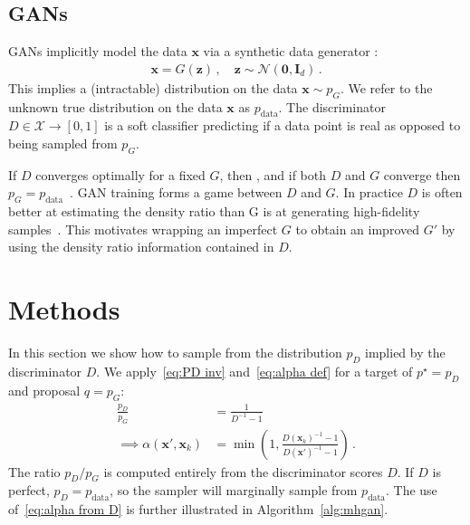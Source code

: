 \documentclass{article}
\renewcommand{\vec}[1]{{\boldsymbol{\mathbf{#1}}}} %
\newcommand{\R}{\mathbb{R}}
\newcommand{\set}[1]{\mathcal{#1}}
\newcommand{\sample}{\sim}
\newcommand{\norm}{\mathcal{N}}
\newcommand{\target}{{p^\star}}
\newcommand{\prop}{q}
\newcommand{\PG}{{p_G}}
\newcommand{\PD}{{p_D}}
\newcommand{\PR}{{p_{\textrm{data}}}}
\newcommand{\accept}{\alpha}
\newcommand{\setx}{\set{X}}
\begin{document}

\subsection{GANs}
\label{sec:GANs}

GANs implicitly model the data $\vec x$ via a synthetic data generator \smash{$G \in \R^{d} \rightarrow \setx$}:
\begin{align}
  \vec x = G(\vec z)\,, \quad \vec z \sample \norm(\vec 0, \vec I_{d})\,.
\end{align}
This implies a (intractable) distribution on the data $\vec x \sample \PG$.
We refer to the unknown true distribution on the data $\vec x$ as $\PR$.
The discriminator $D \in \setx \rightarrow [0,1]$ is a soft classifier predicting if a data point is real as opposed to being sampled from $\PG$\@.

If $D$ converges optimally for a fixed $G$, then \smash{$D = \PR/(\PR + \PG)$}, and if both $D$ and $G$ converge then $\PG = \PR$~\citep{Goodfellow2014}.
GAN training forms a game between $D$ and $G$.
In practice $D$ is often better at estimating the density ratio than G is at generating high-fidelity samples~\citep{Shibuya2017}.
This motivates wrapping an imperfect $G$ to obtain an improved $G'$ by using the density ratio information contained in $D$.



\section{Methods}
\label{sec:Methods}

In this section we show how to sample from the distribution $\PD$ implied by the discriminator $D$.
We apply~\eqref{eq:PD inv} and~\eqref{eq:alpha def} for a target of $\target=\PD$ and proposal $\prop=\PG$:
\begin{align}
  \frac{\PD}{\PG} &= \frac{1}{D^{-1} - 1} \\
  \implies
  \accept(\vec x', \vec x_k) &= \min\left(1, \frac{D(\vec x_k)^{-1} - 1}{D(\vec x')^{-1} - 1}\right)\,. \label{eq:alpha from D}
\end{align}
The ratio $\PD/\PG$ is computed entirely from the discriminator scores $D$.
If $D$ is perfect, $\PD = \PR$, so the sampler will marginally sample from $\PR$.
The use of~\eqref{eq:alpha from D} is further illustrated in Algorithm~\ref{alg:mhgan}.
\end{document}

